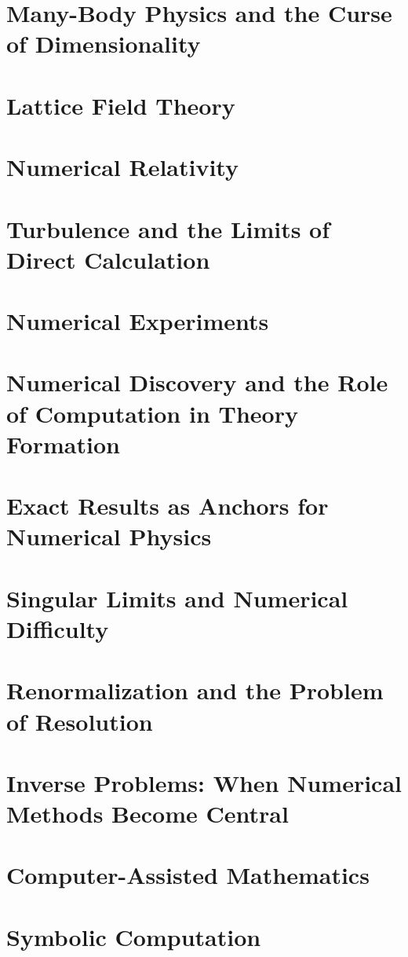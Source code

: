 \section{ Many-Body Physics and the Curse of Dimensionality}
\label{nm:mb}
\section{ Lattice Field Theory}
\label{nm:lft}
\section{ Numerical Relativity}
\label{nm:rel}
\section{ Turbulence and the Limits of Direct Calculation}
\label{nm:trb}
\section{ Numerical Experiments}
\label{nm:ne}
\section{ Numerical Discovery and the Role of Computation in Theory Formation}
\label{nm:rc}
\section{ Exact Results as Anchors for Numerical Physics}
\label{nm:er}
\section{Singular Limits and Numerical Difficulty}
\label{nm:sl}
\section{ Renormalization and the Problem of Resolution}
\label{nm:rn}
\section{Inverse Problems: When Numerical Methods Become Central}
\label{nm:ip}
\section{ Computer-Assisted Mathematics}
\label{nm:cm}
\section{ Symbolic Computation}
\label{nm:sc}
